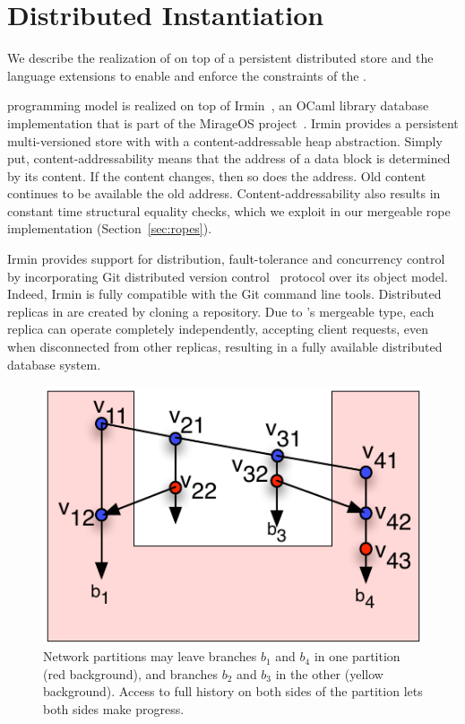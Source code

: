 \section{Distributed Instantiation}
\label{sec:implementation}

We describe the realization of \name on top of a persistent
distributed store and the language extensions to enable and enforce
the constraints of the \name.

\name programming model is realized on top of Irmin~\cite{irmin}, an OCaml
library database implementation that is part of the MirageOS
project~\cite{mirage}. Irmin provides a persistent multi-versioned store with
with a content-addressable heap abstraction. Simply put, content-addressability
means that the address of a data block is determined by its content. If the
content changes, then so does the address. Old content continues to be
available the old address. Content-addressability also results in constant time
structural equality checks, which we exploit in our mergeable rope
implementation (Section~\ref{sec:ropes}).

Irmin provides support for distribution, fault-tolerance and concurrency
control by incorporating Git distributed version control~\cite{git} protocol
over its object model. Indeed, Irmin is fully compatible with the Git command
line tools. Distributed replicas in \name are created by cloning a \name
repository. Due to \name's mergeable type, each replica can operate completely
independently, accepting client requests, even when disconnected from other
replicas, resulting in a fully available distributed database system.

\begin{figure}
	\begin{center}
	\includegraphics[scale=0.8]{Figures/partitions}
	\end{center}
  \caption{Network partitions may leave branches $b_1$ and $b_4$ in
  one partition (red background), and branches $b_2$ and $b_3$ in the
  other (yellow background). Access to full history on both sides of
  the partition lets both sides make progress.}
	\label{fig:partitions}
\end{figure}

